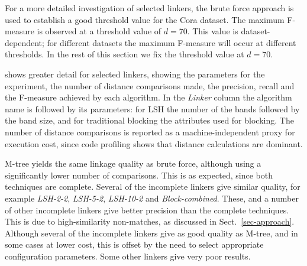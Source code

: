 \documentclass{llncs}
\begin{document}
For a more detailed investigation of selected linkers, the brute force
approach is used to establish a good threshold value for the Cora
dataset. The maximum F-measure is observed at a threshold value of
$d=70$. This value is dataset-dependent; for different datasets the
maximum F-measure will occur at different thresholds. In the rest of
this section we fix the threshold value at $d=70$.

 shows greater detail for selected
linkers, showing the parameters for the experiment, the number of
distance comparisons made, the precision, recall and the F-measure
achieved by each algorithm. In the \emph{Linker} column the algorithm
name is followed by its parameters: for LSH the number of the bands
followed by the band size, and for traditional blocking the attributes
used for blocking. The number of distance comparisons is reported as a
machine-independent proxy for execution cost, since code profiling
shows that distance calculations are dominant.

M-tree yields the same linkage quality as brute force, although using a
significantly lower number of comparisons. This is as expected, since
both techniques are complete. Several of the incomplete linkers give
similar quality, for example \emph{LSH-2-2}, \emph{LSH-5-2},
\emph{LSH-10-2} and \emph{Block-combined}. These, and a number of other
incomplete linkers give better precision than the complete techniques.
This is due to high-similarity non-matches, as discussed in
Sect.~\ref{sec-approach}. Although several of the incomplete linkers
give as good quality as M-tree, and in some cases at lower cost, this is
offset by the need to select appropriate configuration parameters. Some
other linkers give very poor results.

\end{document}
